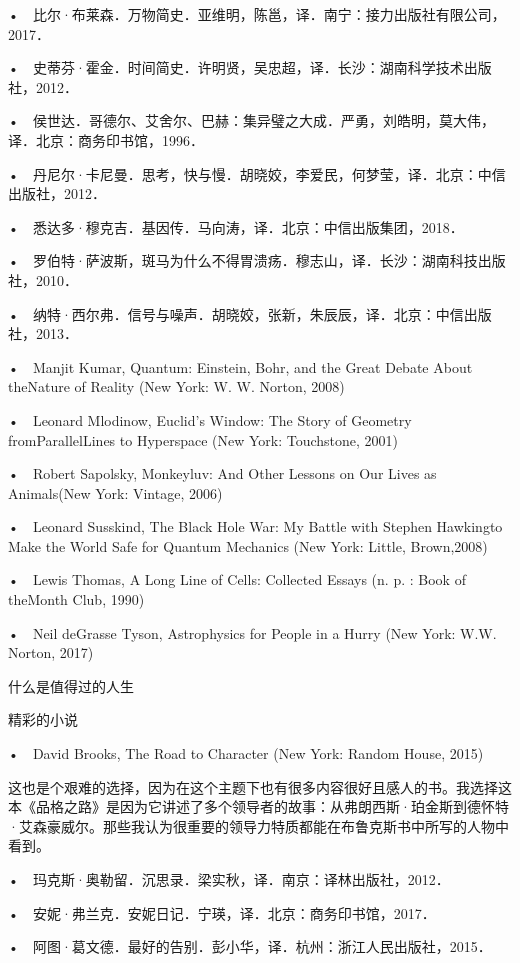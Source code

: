 •　比尔·布莱森．万物简史．亚维明，陈邕，译．南宁：接力出版社有限公司，2017．

•　史蒂芬·霍金．时间简史．许明贤，吴忠超，译．长沙：湖南科学技术出版社，2012．

•　侯世达．哥德尔、艾舍尔、巴赫：集异璧之大成．严勇，刘皓明，莫大伟，译．北京：商务印书馆，1996．

•　丹尼尔·卡尼曼．思考，快与慢．胡晓姣，李爱民，何梦莹，译．北京：中信出版社，2012．

•　悉达多·穆克吉．基因传．马向涛，译．北京：中信出版集团，2018．

•　罗伯特·萨波斯，斑马为什么不得胃溃疡．穆志山，译．长沙：湖南科技出版社，2010．

•　纳特·西尔弗．信号与噪声．胡晓姣，张新，朱辰辰，译．北京：中信出版社，2013．

•　Manjit Kumar, Quantum: Einstein, Bohr, and the Great Debate About theNature of Reality (New York: W. W. Norton, 2008)

•　Leonard Mlodinow, Euclid’s Window: The Story of Geometry fromParallelLines to Hyperspace (New York: Touchstone, 2001)

•　Robert Sapolsky, Monkeyluv: And Other Lessons on Our Lives as Animals(New York: Vintage, 2006)

•　Leonard Susskind, The Black Hole War: My Battle with Stephen Hawkingto Make the World Safe for Quantum Mechanics (New York: Little, Brown,2008)

•　Lewis Thomas, A Long Line of Cells: Collected Essays (n. p. : Book of theMonth Club, 1990)

•　Neil deGrasse Tyson, Astrophysics for People in a Hurry (New York: W.W. Norton, 2017)



什么是值得过的人生

精彩的小说

•　David Brooks, The Road to Character (New York: Random House, 2015)

这也是个艰难的选择，因为在这个主题下也有很多内容很好且感人的书。我选择这本《品格之路》是因为它讲述了多个领导者的故事：从弗朗西斯·珀金斯到德怀特·艾森豪威尔。那些我认为很重要的领导力特质都能在布鲁克斯书中所写的人物中看到。

•　玛克斯·奥勒留．沉思录．梁实秋，译．南京：译林出版社，2012．

•　安妮·弗兰克．安妮日记．宁瑛，译．北京：商务印书馆，2017．

•　阿图·葛文德．最好的告别．彭小华，译．杭州：浙江人民出版社，2015．

